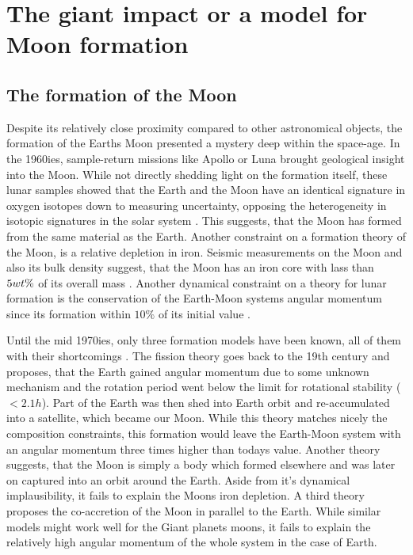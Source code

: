 \chapter{The giant impact or a model for Moon formation}
\label{ch05}
\graphicspath{{./05figs/}}

\section{The formation of the Moon}
Despite its relatively close proximity compared to other astronomical objects, the formation of the Earths Moon presented a mystery deep within the space-age. In the 1960ies, sample-return missions like Apollo or Luna brought geological insight into the Moon. While not directly shedding light on the formation itself, these lunar samples showed that the Earth and the Moon have an identical signature in oxygen isotopes down to measuring uncertainty, opposing the heterogeneity in isotopic signatures in the solar system \citep{Wiechert:2001p3543}. This suggests, that the Moon has formed from the same material as the Earth. Another constraint on a formation theory of the Moon, is a relative depletion in iron. Seismic measurements on the Moon and also its bulk density suggest, that the Moon has an iron core with lass than $5 wt\mathrm{\%}$ of its overall mass \citep{2011Sci...331..309W}. Another dynamical constraint on a theory for lunar formation is the conservation of the Earth-Moon systems angular momentum since its formation within $10\%$ of its initial value \citep{Canup:2001p3295}. 

Until the mid 1970ies, only three formation models have been known, all of them with their shortcomings \citep{Stevenson:1987p3540}. The fission theory goes back to the 19th century and proposes, that the Earth gained angular momentum due to some unknown mechanism and the rotation period went below the limit for rotational stability ($< 2.1h$). Part of the Earth was then shed into Earth orbit and re-accumulated into a satellite, which became our Moon. While this theory matches nicely the composition constraints, this formation would leave the Earth-Moon system with an angular momentum three times higher than todays value. Another theory suggests, that the Moon is simply a body which formed elsewhere and was later on captured into an orbit around the Earth. Aside from it's dynamical implausibility, it fails to explain the Moons iron depletion. A third theory proposes the co-accretion of the Moon in parallel to the Earth. While similar models might work well for the Giant planets moons, it fails to explain the relatively high angular momentum of the whole system in the case of Earth.

